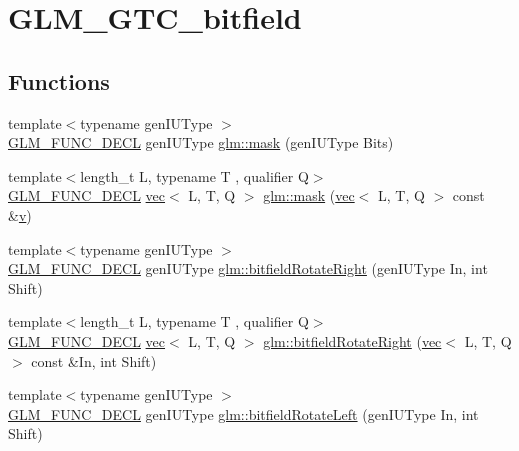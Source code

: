 \hypertarget{group__gtc__bitfield}{}\section{G\+L\+M\+\_\+\+G\+T\+C\+\_\+bitfield}
\label{group__gtc__bitfield}
\subsection*{Functions}
\begin{DoxyCompactItemize}
\item 
{\footnotesize template$<$typename gen\+I\+U\+Type $>$ }\\\mbox{\hyperlink{setup_8hpp_ab2d052de21a70539923e9bcbf6e83a51}{G\+L\+M\+\_\+\+F\+U\+N\+C\+\_\+\+D\+E\+CL}} gen\+I\+U\+Type \mbox{\hyperlink{group__gtc__bitfield_gad7eba518a0b71662114571ee76939f8a}{glm\+::mask}} (gen\+I\+U\+Type Bits)
\item 
{\footnotesize template$<$length\+\_\+t L, typename T , qualifier Q$>$ }\\\mbox{\hyperlink{setup_8hpp_ab2d052de21a70539923e9bcbf6e83a51}{G\+L\+M\+\_\+\+F\+U\+N\+C\+\_\+\+D\+E\+CL}} \mbox{\hyperlink{structglm_1_1vec}{vec}}$<$ L, T, Q $>$ \mbox{\hyperlink{group__gtc__bitfield_ga2e64e3b922a296033b825311e7f5fff1}{glm\+::mask}} (\mbox{\hyperlink{structglm_1_1vec}{vec}}$<$ L, T, Q $>$ const \&\mbox{\hyperlink{_s_d_l__opengl_8h_a10a82eabcb59d2fcd74acee063775f90}{v}})
\item 
{\footnotesize template$<$typename gen\+I\+U\+Type $>$ }\\\mbox{\hyperlink{setup_8hpp_ab2d052de21a70539923e9bcbf6e83a51}{G\+L\+M\+\_\+\+F\+U\+N\+C\+\_\+\+D\+E\+CL}} gen\+I\+U\+Type \mbox{\hyperlink{group__gtc__bitfield_ga1c33d075c5fb8bd8dbfd5092bfc851ca}{glm\+::bitfield\+Rotate\+Right}} (gen\+I\+U\+Type In, int Shift)
\item 
{\footnotesize template$<$length\+\_\+t L, typename T , qualifier Q$>$ }\\\mbox{\hyperlink{setup_8hpp_ab2d052de21a70539923e9bcbf6e83a51}{G\+L\+M\+\_\+\+F\+U\+N\+C\+\_\+\+D\+E\+CL}} \mbox{\hyperlink{structglm_1_1vec}{vec}}$<$ L, T, Q $>$ \mbox{\hyperlink{group__gtc__bitfield_ga590488e1fc00a6cfe5d3bcaf93fbfe88}{glm\+::bitfield\+Rotate\+Right}} (\mbox{\hyperlink{structglm_1_1vec}{vec}}$<$ L, T, Q $>$ const \&In, int Shift)
\item 
{\footnotesize template$<$typename gen\+I\+U\+Type $>$ }\\\mbox{\hyperlink{setup_8hpp_ab2d052de21a70539923e9bcbf6e83a51}{G\+L\+M\+\_\+\+F\+U\+N\+C\+\_\+\+D\+E\+CL}} gen\+I\+U\+Type \mbox{\hyperlink{group__gtc__bitfield_ga2eb49678a344ce1495bdb5586d9896b9}{glm\+::bitfield\+Rotate\+Left}} (gen\+I\+U\+Type In, int Shift)

\end{DoxyCompactItemize}

